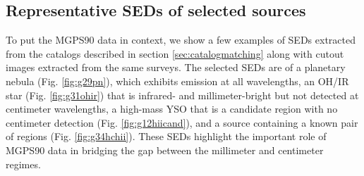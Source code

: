 \documentclass[twocolumn]{aastex62}
\def\todo#1{{\textcolor{red}{TODO: #1}}}
\newcommand{\MGPS}{MGPS90\xspace}
\begin{document}
\subsection{Representative SEDs of selected sources}
To put the \MGPS data in context, we show a few examples of SEDs extracted
from the catalogs described in section \ref{sec:catalogmatching} along with
cutout images extracted from the same surveys.  The selected SEDs are of a
planetary nebula (Fig. \ref{fig:g29pn}), which exhibits emission at all
wavelengths, an OH/IR star (Fig. \ref{fig:g31ohir}) that is infrared- and
millimeter-bright but not detected at centimeter wavelengths, a high-mass
YSO that is a candidate \hchii region with no centimeter detection (Fig.
\ref{fig:g12hiicand}), and a source containing a known pair of \hchii regions
(Fig.  \ref{fig:g34hchii}).  These SEDs highlight the important role of \MGPS
data in bridging the gap between the millimeter and centimeter regimes.

\end{document}
